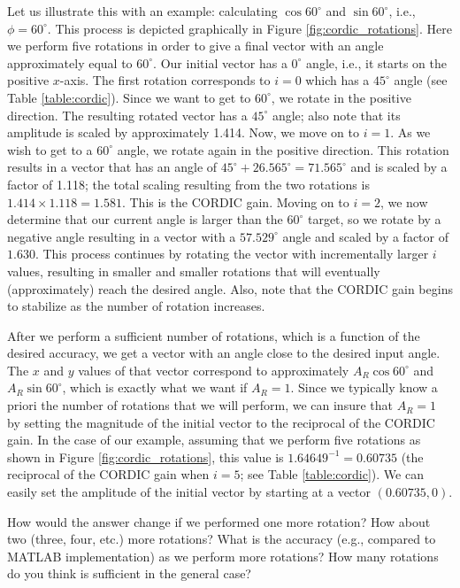 Let us illustrate this with an example: calculating $ \cos 60^{\circ}$ and $\sin 60^{\circ}$, i.e., $\phi = 60^{\circ}$. This process is depicted graphically in Figure \ref{fig:cordic_rotations}. Here we perform five rotations in order to give a final vector with an angle approximately equal to $60^{\circ}$. Our initial vector has a $0^{\circ}$ angle, i.e., it starts on the positive $x$-axis. The first rotation corresponds to $i=0$ which has a $45^{\circ}$ angle (see Table \ref{table:cordic}). Since we want to get to $60^{\circ}$, we rotate in the positive direction. The resulting rotated vector has a $45^{\circ}$ angle; also note that its amplitude is scaled by approximately 1.414. Now, we move on to $i=1$. As we wish to get to a $60^{\circ}$ angle, we rotate again in the positive direction. This rotation results in a vector that has an angle of $45^{\circ} + 26.565^{\circ} = 71.565^{\circ}$ and is scaled by a factor of 1.118; the total scaling resulting from the two rotations is $1.414 \times 1.118 = 1.581$. This is the CORDIC gain. Moving on to $i=2$, we now determine that our current angle is larger than the $60^{\circ}$ target, so we rotate by a negative angle resulting in a vector with a $57.529^{\circ}$ angle and scaled by a factor of $1.630$. This process continues by rotating the vector with incrementally larger $i$ values, resulting in smaller and smaller rotations that will eventually (approximately) reach the desired angle.  Also, note that the CORDIC gain begins to stabilize as the number of rotation increases.

After we perform a sufficient number of rotations, which is a function of the desired accuracy, we get a vector with an angle close to the desired input angle. The $x$ and $y$ values of that vector correspond to approximately $A_R \cos 60^{\circ}$ and $A_R \sin 60^{\circ}$, which is exactly what we want if $A_R = 1$. Since we typically know a priori the number of rotations that we will perform, we can insure that $A_R = 1$ by setting the magnitude of the initial vector to the reciprocal of the CORDIC gain. In the case of our example, assuming that we perform five rotations as shown in Figure \ref{fig:cordic_rotations}, this value is $1.64649^{-1} = 0.60735$ (the reciprocal of the CORDIC gain when $i=5$; see Table \ref{table:cordic}). We can easily set the amplitude of the initial vector by starting at a vector $(0.60735, 0)$. 

\begin{exercise}
How would the answer change if we performed one more rotation? How about two (three, four, etc.) more rotations? What is the accuracy (e.g., compared to MATLAB implementation) as we perform more rotations? How many rotations do you think is sufficient in the general case?
\end{exercise}


